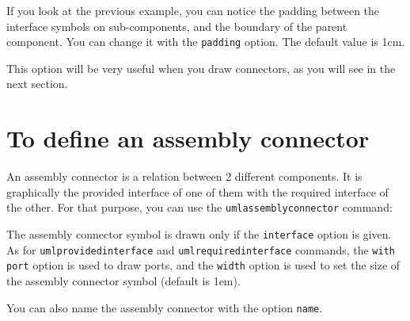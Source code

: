 \documentclass[a4paper,11pt]{report}
\begin{document}
\medskip

If you look at the previous example, you can notice the padding between the interface symbols on sub-components, and the boundary of the parent component. You can change it with the {\tt padding} option. The default value is 1cm. 

\medskip

\begin{minipage}{0.45\textwidth}

\end{minipage}
\begin{minipage}{0.55\textwidth}
\begin{center}
\end{center}
\end{minipage}

\medskip

This option will be very useful when you draw connectors, as you will see in the next section.

\section{To define an assembly connector}

An assembly connector is a relation between 2 different components. It is graphically the provided interface of one of them with the required interface of the other.
For that purpose, you can use the {\tt umlassemblyconnector} command:

\medskip

\begin{minipage}{0.45\textwidth}

\end{minipage}
\begin{minipage}{0.55\textwidth}
\begin{center}
\end{center}
\end{minipage}

\medskip

The assembly connector symbol is drawn only if the {\tt interface} option is given. As for {\tt umlprovidedinterface} and {\tt umlrequiredinterface} commands, the {\tt with port} option is used to draw ports, and the {\tt width} option is used to set the size of the assembly connector symbol (default is 1em).

You can also name the assembly connector with the option {\tt name}.
\end{document}
